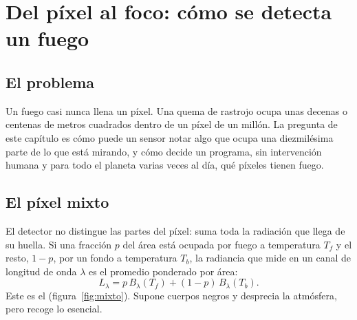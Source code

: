 \chapter{Del píxel al foco: cómo se detecta un fuego}\label{cap:deteccion}


\section{El problema}

Un fuego casi nunca llena un píxel. Una quema de rastrojo ocupa unas decenas o centenas de
metros cuadrados dentro de un píxel de un millón. La pregunta de este capítulo es cómo puede un
sensor notar algo que ocupa una diezmilésima parte de lo que está mirando, y cómo decide un
programa, sin intervención humana y para todo el planeta varias veces al día, qué píxeles tienen
fuego.

\section{El píxel mixto}

El detector no distingue las partes del píxel: suma toda la radiación que llega de su huella. Si
una fracción $p$ del área está ocupada por fuego a temperatura $T_f$ y el resto, $1-p$, por un
fondo a temperatura $T_b$, la radiancia que mide en un canal de longitud de onda $\lambda$ es el
promedio ponderado por área:
\begin{equation}\label{eq:mixto}
  L_\lambda = p\,B_\lambda(T_f) + (1-p)\,B_\lambda(T_b).
\end{equation}
Este es el  (figura~\ref{fig:mixto}). Supone cuerpos negros y
desprecia la atmósfera, pero recoge lo esencial.

